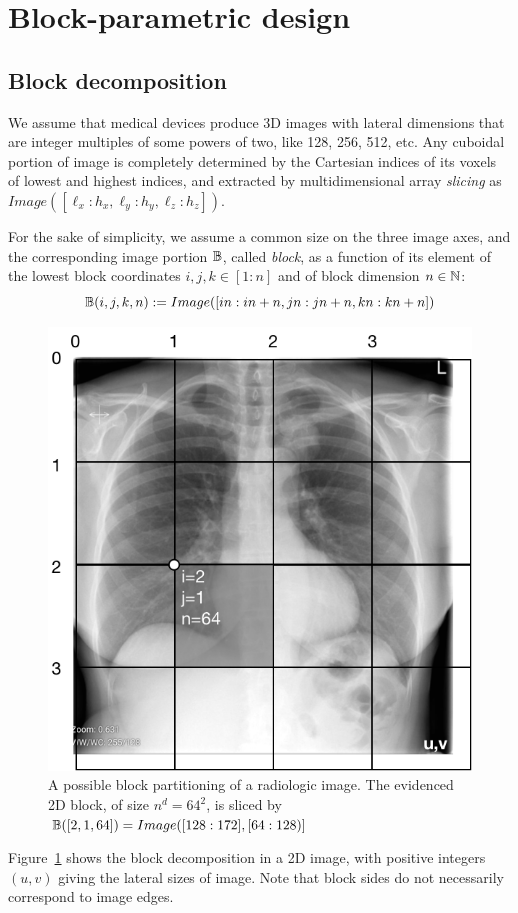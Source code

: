 \documentclass[11pt, oneside]{amsart}   	%
\begin{document}
%

\section{Block-parametric design}\label{sec:filter}

\subsection{Block decomposition}\label{sec:block-decomposition}

We assume that medical devices produce 3D images with lateral dimensions that are integer multiples of some powers of two, like 128, 256, 512, etc.
Any cuboidal portion of image is completely determined by the Cartesian indices of its voxels of lowest and highest indices, and extracted by multidimensional array \emph{slicing} as $Image([\ell_x : h_x, \ell_y : h_y, \ell_z : h_z])$.

For the sake of simplicity, we assume a common size on the three image axes, and the corresponding image portion $\mathbb{B}$, called \emph{block}, as a function of its element of the  lowest  block  coordinates $i,j,k\in [1:n]$ and of block dimension $n\in\mathbb{N}$:
\[
\mathbb{B}(i,j,k,n) := Image([in:in+n, jn:jn+n, kn:kn+n]) 
\]

\begin{figure}[htbp] %
   \centering
   \includegraphics[width=0.5\linewidth]{figs/blocks} 
   \caption{A possible block partitioning of a radiologic image. The evidenced 2D block, of size $n^d=64^2$, is sliced by $\mathbb{B}([2,1,64]) = Image([128:172],[64:128)]$}
   \label{fig:blocks}
\end{figure}


Figure~\ref{fig:blocks} shows the block decomposition in a 2D image, with positive integers $(u,v)$ giving the lateral sizes of image. Note that block sides do not necessarily correspond to image edges. 
\end{document}
